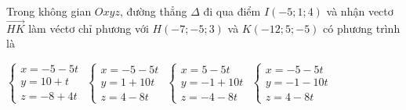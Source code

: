 \documentclass[12pt,a4paper]{article}
\begin{document}
\begin{ex}
 Trong không gian ${Oxyz}$, đường thẳng ${\Delta}$ đi qua điểm ${I(-5;1;4)}$ và nhận vectơ $\overrightarrow{HK}$ làm véctơ chỉ phương với $H(-7;-5;3)$ và $K(-12;5;-5)$ có phương trình là
 
\choice
{ $\left\{ \begin{array}{l}x = -5-5t\\ y = 10+t\\z = -8+4t\end{array} \right.$ }
   { \True $\left\{ \begin{array}{l}x = -5-5t\\ y = 1+10t\\z = 4-8t\end{array} \right.$ }
     { $\left\{ \begin{array}{l}x = 5-5t\\ y = -1+10t\\z = -4-8t\end{array} \right.$ }
    { $\left\{ \begin{array}{l}x = -5-5t\\ y = -1-10t\\z = 4-8t\end{array} \right.$ }
\end{ex}
\end{document}
